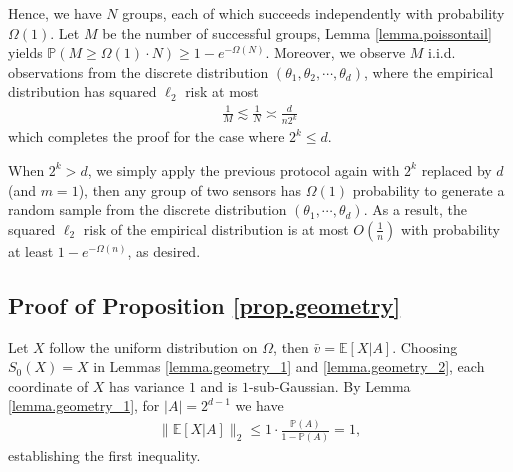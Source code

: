 \documentclass[final,12pt]{colt2018} %
\def \bP {\mathbb{P}}
\def \bE {\mathbb{E}}
\begin{document}
Hence, we have $N$ groups, each of which succeeds independently with probability $\Omega(1)$. Let $M$ be the number of successful groups, Lemma \ref{lemma.poissontail} yields $\bP(M\ge \Omega(1)\cdot N)\ge 1-e^{-\Omega(N)}$. Moreover, we observe $M$ i.i.d. observations from the discrete distribution $(\theta_1,\theta_2,\cdots,\theta_d)$, where the empirical distribution has squared $\ell_2$ risk at most 
\begin{align*}
\frac{1}{M} \lesssim \frac{1}{N} \asymp \frac{d}{n2^k}
\end{align*}
which completes the proof for the case where $2^k\le d$. 


When $2^k>d$, we simply apply the previous protocol again with $2^k$ replaced by $d$ (and $m=1$), then any group of two sensors has $\Omega(1)$ probability to generate a random sample from the discrete distribution $(\theta_1,\cdots,\theta_d)$. As a result, the squared $\ell_2$ risk of the empirical distribution is at most $O(\frac{1}{n})$ with probability at least $1-e^{-\Omega(n)}$, as desired. 

\subsection{Proof of Proposition \ref{prop.geometry}}
Let $X$ follow the uniform distribution on $\Omega$, then $\bar{v}=\bE[X|A]$. Choosing $S_0(X)=X$ in Lemmas \ref{lemma.geometry_1} and \ref{lemma.geometry_2}, each coordinate of $X$ has variance $1$ and is $1$-sub-Gaussian. By Lemma \ref{lemma.geometry_1}, for $|A|=2^{d-1}$ we have
\begin{align*}
\|\bE[X|A]\|_2 \le 1\cdot \frac{\bP(A)}{1-\bP(A)} = 1, 
\end{align*}
establishing the first inequality. 
\end{document}
